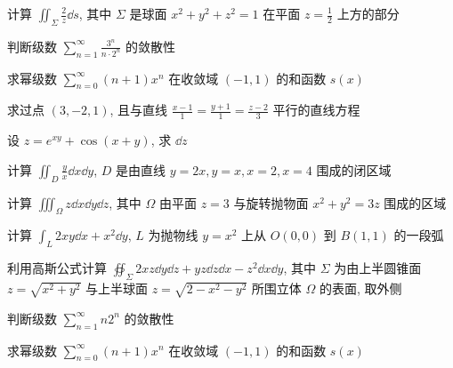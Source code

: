 \begin{ti}[$8$ 分]
	计算 $\iint_{\Sigma} \frac{2}{z} \dd{s}$, 其中 $\Sigma$ 是球面 $x^{2}+y^{2}+z^{2}=1$ 在平面 $z=\frac{1}{2}$ 上方的部分
\end{ti}

\begin{ti}[$6$ 分]
	判断级数 $\sum_{n=1}^{\infty} \frac{3^{n}}{n \cdot 2^{n}}$ 的敛散性
\end{ti}

\begin{ti}[$6$ 分]
	求幂级数 $\sum_{n=0}^{\infty}(n+1) x^{n}$ 在收敛域 $(-1,1)$ 的和函数 $s(x)$
\end{ti}

\begin{ti}[$6$ 分]
	求过点 $(3,-2,1)$, 且与直线 $\frac{x-1}{1}=\frac{y+1}{1}=\frac{z-2}{3}$ 平行的直线方程
\end{ti}

\begin{ti}[$6$ 分]
	设 $ z = e^{xy} + \cos(x + y)$, 求 $\dd{z}$
\end{ti}

\begin{ti}[$6$ 分]
	计算 $\iint_{D}\frac{y}{x}\dd{x}\dd{y}$, $D$ 是由直线 $ y = 2x,y = x, x = 2, x = 4$ 围成的闭区域
\end{ti}

\begin{ti}[$6$ 分]
	计算 $\iiint_{\Omega}z\dd{x}\dd{y}\dd{z}$, 其中 $\Omega$ 由平面 $z = 3$ 与旋转抛物面 $x^2 + y^2 = 3z$ 围成的区域
\end{ti}

\begin{ti}[$6$ 分]
	计算 $\int_{L} 2 x y \dd{x}+x^{2} \dd{y}$, $L$ 为抛物线 $y=x^{2}$ 上从 $O(0,0)$ 到 $B(1,1)$ 的一段弧
\end{ti}

\begin{ti}[$8$ 分]
	利用高斯公式计算 $\oiint_{\Sigma} 2 x z \dd{y} \dd{z}+y z \dd{z} \dd{x}-z^{2} \dd{x} \dd{y}$, 其中 $\Sigma$ 为由上半圆锥面 $z=\sqrt{x^{2}+y^{2}}$ 与上半球面 $z=\sqrt{2-x^{2}-y^{2}}$ 所围立体 $\Omega$ 的表面, 取外侧
\end{ti}

\begin{ti}[$6$ 分]
	判断级数 $\sum_{n=1}^{\infty} n 2^{n}$ 的敛散性
\end{ti}

\begin{ti}[$6$ 分]
	求幂级数 $\sum_{n=0}^{\infty}(n+1) x^{n}$ 在收敛域 $(-1,1)$ 的和函数 $s(x)$
\end{ti}

